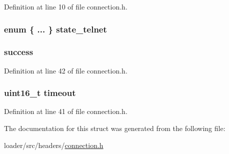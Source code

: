 Definition at line 10 of file connection.\+h.

\subsubsection[{\texorpdfstring{state\+\_\+telnet}{state_telnet}}]{\setlength{\rightskip}{0pt plus 5cm}enum \{ ... \}   state\+\_\+telnet}\hypertarget{structconnection_a86edf08e7089b8c6cb5e37b284913496}{}\label{structconnection_a86edf08e7089b8c6cb5e37b284913496}
\subsubsection[{\texorpdfstring{success}{success}}]{ success}\hypertarget{structconnection_ac4403be70190235a7adbfb00e7b2e656}{}\label{structconnection_ac4403be70190235a7adbfb00e7b2e656}


Definition at line 42 of file connection.\+h.

\subsubsection[{\texorpdfstring{timeout}{timeout}}]{\setlength{\rightskip}{0pt plus 5cm}uint16\+\_\+t timeout}\hypertarget{structconnection_a7f1ad43d3bf79b40bc39dbb5a6c3a5ae}{}\label{structconnection_a7f1ad43d3bf79b40bc39dbb5a6c3a5ae}


Definition at line 41 of file connection.\+h.



The documentation for this struct was generated from the following file\+:\begin{DoxyCompactItemize}
\item 
loader/src/headers/\hyperlink{connection_8h}{connection.\+h}\end{DoxyCompactItemize}
